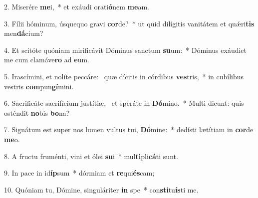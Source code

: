 2. Miserére \textbf{me}i,~*  et exáudi orati\textbf{ó}nem \textbf{me}am.\

3. Fílii hóminum, úsquequo gravi \textbf{cor}de?~*  ut quid dilígitis vanitátem et quǽri\textbf{tis} men\textbf{dá}cium?\

4. Et scitóte quóniam mirificávit Dóminus sanctum \textbf{su}um:~*  Dóminus exáudiet me cum clamáve\textbf{ro} ad \textbf{e}um.\

5. Irascímini, et nolíte peccáre: \dag\  quæ dícitis in córdibus \textbf{ves}tris,~*  in cubílibus vestris \textbf{com}pun\textbf{gí}mini.\

6. Sacrificáte sacrifícium justítiæ, \dag\  et speráte in \textbf{Dó}mino.~*  Multi dicunt: quis osténdit \textbf{no}bis \textbf{bo}na?\

7. Signátum est super nos lumen vultus tui, \textbf{Dó}mine:~*  dedísti lætítiam in \textbf{cor}de \textbf{me}o.\

8. A fructu fruménti, vini et ólei \textbf{su}i~*  mul\textbf{ti}pli\textbf{cá}ti sunt.\

9. In pace in id\textbf{íp}sum~*  dórmiam et \textbf{re}qui\textbf{és}cam;\

10. Quóniam tu, Dómine, singuláriter \textbf{in} spe~*  con\textbf{sti}tu\textbf{ís}ti me.\


